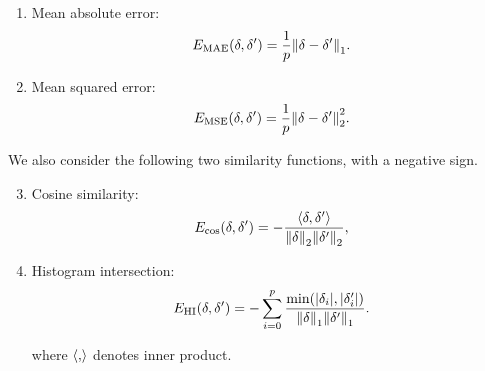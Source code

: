 \begin{enumerate}[itemsep=2pt, parsep=0pt, topsep=3pt]

 	\item Mean absolute error:
 	\begin{equation}
 		E_{\textrm{MAE}}(\delta, \delta') = \frac{1}{p} \norm{\delta - \delta'}_1.
 	\label{eq:mae}
    \end{equation}  
 	\item Mean squared error:
 	\begin{equation}
 		E_{\textrm{MSE}}(\delta, \delta') = \frac{1}{p} \norm{\delta - \delta'}_2^2.
 	\label{eq:mse}
 	\end{equation}

\end{enumerate}

We also consider the following two similarity functions, with a negative sign.
\begin{enumerate}[itemsep=2pt, parsep=0pt, topsep=3pt]
	\setcounter{enumi}{2}
	\item Cosine similarity:
	\begin{equation}
		E_{\cos}(\delta, \delta') = -\frac{\left\langle{\delta, \delta'}\right\rangle}{\norm{\delta}_2 \norm{\delta'}_2},
	\label{eq:cos}
	\end{equation}
 
	\item Histogram intersection:
	\begin{equation}
		E_{\textrm{HI}}(\delta, \delta') = -\sum_{i=0}^p 
			\frac{\min(\abs{\delta_i}, \abs{\delta'_i})}{\norm{\delta}_1 \norm{\delta'}_1}.
	\label{eq:hi}
	\end{equation}

	where $\left\langle{,}\right\rangle$ denotes inner product.

\end{enumerate}



